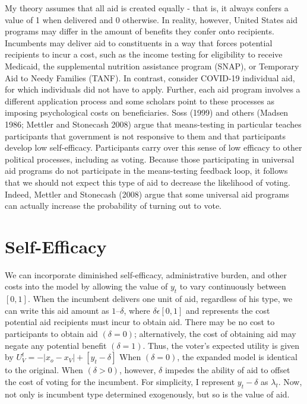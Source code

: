 \documentclass[12pt]{paper}
\begin{document}
My theory assumes that all aid is created equally - that is, it always confers a value of 1 when delivered and 0 otherwise. In reality, however, United States aid programs may differ in the amount of benefits they confer onto recipients. Incumbents may deliver aid to constituents in a way that forces potential recipients to incur a cost, such as the income testing for eligibility to receive Medicaid, the supplemental nutrition assistance program (SNAP), or Temporary Aid to Needy Families (TANF). In contrast, consider COVID-19 individual aid, for which individuals did not have to apply. Further, each aid program involves a different application process and some scholars point to these processes as imposing psychological costs on beneficiaries. Soss (1999) and others (Madsen 1986; Mettler and Stonecash 2008) argue that means-testing in particular teaches participants that government is not responsive to them and that participants develop low self-efficacy. Participants carry over this sense of low efficacy to other political processes, including as voting. Because those participating in universal aid programs do not participate in the means-testing feedback loop, it follows that we should not expect this type of aid to decrease the likelihood of voting. Indeed, Mettler and Stonecash (2008) argue that some universal aid programs can actually increase the probability of turning out to vote.

\section{Self-Efficacy}
We can incorporate diminished self-efficacy, administrative burden, and other costs into the model by allowing the value of $y_t$ to vary continuously between $[0,1]$. When the incumbent delivers one unit of aid, regardless of his type, we can write this aid amount as $1 – \delta$, where $\delta \epsilon [0,1]$ and represents the cost potential aid recipients must incur to obtain aid. There may be no cost to participants to obtain aid $(\delta = 0)$; alternatively, the cost of obtaining aid may negate any potential benefit $(\delta = 1)$. Thus, the voter’s expected utility is given by $U_{V}^t = -|x_o - x_V| + [y_t - \delta]$ When $(\delta = 0)$, the expanded model is identical to the original. When $(\delta > 0)$, however, $\delta$ impedes the ability of aid to offset the cost of voting for the incumbent. For simplicity, I represent $y_t - \delta$ as  $\lambda_t$. Now, not only is incumbent type determined exogenously, but so is the value of aid.
\end{document}
